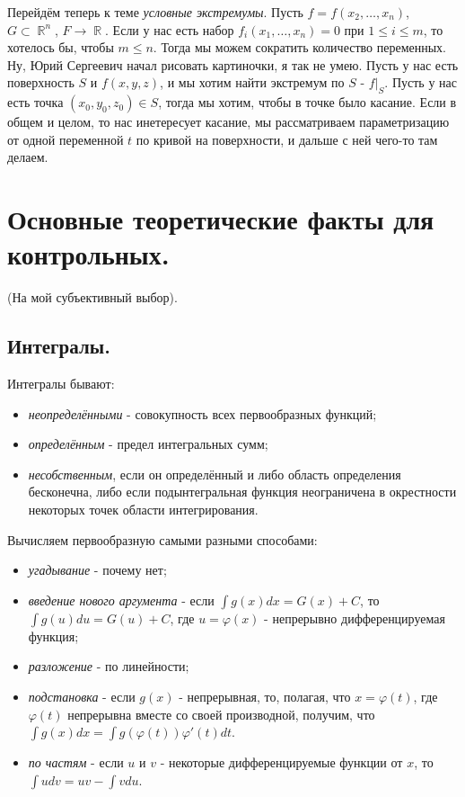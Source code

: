 \documentclass[a4paper,100pt]{article}
\theoremstyle{indented}
\theoremstyle{definition}
\theoremstyle{remark}
\DeclareMathOperator{\RR}{\mathbb{R}}
\begin{document}
Перейдём теперь к теме \textit{условные экстремумы}. Пусть $f=f(x_2, \ldots, x_n)$, $G\subset \RR^n$, $F\rightarrow \RR$. Если у нас есть набор $f_i(x_1, \ldots, x_n)=0$ при $1\leq i\leq m$, то хотелось бы, чтобы $m\leq n$. Тогда мы можем сократить количество переменных. Ну, Юрий Сергеевич начал рисовать картиночки, я так не умею. Пусть у нас есть поверхность $S$ и $f(x,y,z)$, и мы хотим найти экстремум по $S$ - $f|_S$. Пусть у нас есть точка $(x_0, y_0, z_0)\in S$, тогда мы хотим, чтобы в точке было касание. Если в общем и целом, то нас инетересует касание, мы рассматриваем параметризацию от одной переменной $t$ по кривой на поверхности, и дальше с ней чего-то там делаем.



\newpage

\section{Основные теоретические факты для контрольных.}

(На мой субъективный выбор). \ 

\subsection{Интегралы.}

Интегралы бывают: \ 

\begin{itemize}
    \item \textit{неопределёнными} - совокупность всех первообразных функций;
    \item \textit{определённым} - предел интегральных сумм;
    \item \textit{несобственным}, если он определённый и либо область определения бесконечна, либо если подынтегральная функция неограничена в окрестности некоторых точек области интегрирования. 
\end{itemize}

Вычисляем первообразную самыми разными способами: \

\begin{itemize}
    \item \textit{угадывание} - почему нет;
    \item \textit{введение нового аргумента} - если $\int g(x)dx = G(x)+C$, то $\int g(u)du = G(u)+C$, где $u = \varphi(x)$ - непрерывно дифференцируемая функция;
    \item \textit{разложение} - по линейности;
    \item \textit{подстановка} - если $g(x)$ - непрерывная, то, полагая, что $x=\varphi(t)$, где $\varphi(t)$ непрерывна вместе со своей производной, получим, что $\int g(x)dx = \int g(\varphi(t))\varphi'(t)dt$. 
    \item \textit{по частям} - если $u$ и $v$ - некоторые дифференцируемые функции от $x$, то $\int udv = uv - \int vdu$. 
\end{itemize}
\end{document}
